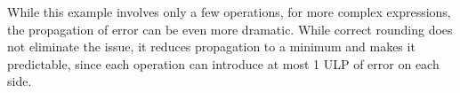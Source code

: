 While this example involves only a few operations, for more complex expressions, the propagation of error can be even more dramatic. 
While correct rounding does not eliminate the issue, it reduces propagation to a minimum and makes it predictable, since each operation can introduce at most 1 ULP of error on each side.

%
